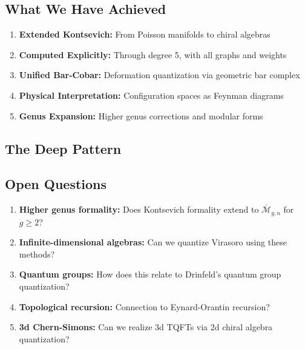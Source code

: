 \subsection{What We Have Achieved}

\begin{enumerate}
\item \textbf{Extended Kontsevich:} From Poisson manifolds to chiral algebras
\item \textbf{Computed Explicitly:} Through degree 5, with all graphs and weights
\item \textbf{Unified Bar-Cobar:} Deformation quantization via geometric bar complex
\item \textbf{Physical Interpretation:} Configuration spaces as Feynman diagrams
\item \textbf{Genus Expansion:} Higher genus corrections and modular forms
\end{enumerate}

\subsection{The Deep Pattern}

\begin{center}
\end{center}

\subsection{Open Questions}

\begin{enumerate}
\item \textbf{Higher genus formality:} Does Kontsevich formality extend to $\overline{\mathcal{M}}_{g,n}$ for $g \geq 2$?

\item \textbf{Infinite-dimensional algebras:} Can we quantize Virasoro using these methods?

\item \textbf{Quantum groups:} How does this relate to Drinfeld's quantum group quantization?

\item \textbf{Topological recursion:} Connection to Eynard-Orantin recursion?

\item \textbf{3d Chern-Simons:} Can we realize 3d TQFTs via 2d chiral algebra quantization?
\end{enumerate}

